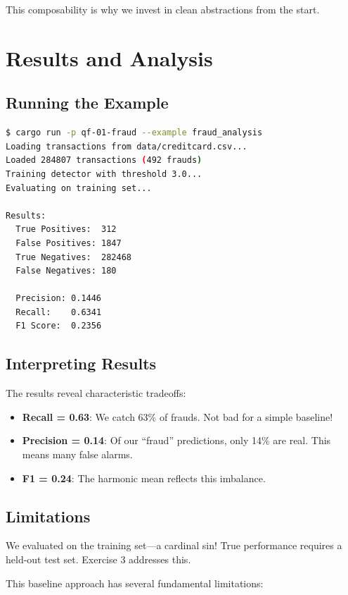This composability is why we invest in clean abstractions from the start.

\section{Results and Analysis}

\subsection{Running the Example}

\begin{lstlisting}[language=bash]
$ cargo run -p qf-01-fraud --example fraud_analysis
Loading transactions from data/creditcard.csv...
Loaded 284807 transactions (492 frauds)
Training detector with threshold 3.0...
Evaluating on training set...

Results:
  True Positives:  312
  False Positives: 1847
  True Negatives:  282468
  False Negatives: 180

  Precision: 0.1446
  Recall:    0.6341
  F1 Score:  0.2356
\end{lstlisting}

\subsection{Interpreting Results}

The results reveal characteristic tradeoffs:

\begin{itemize}
    \item \textbf{Recall = 0.63}: We catch 63\% of frauds. Not bad for a simple baseline!
    \item \textbf{Precision = 0.14}: Of our ``fraud'' predictions, only 14\% are real. This means many false alarms.
    \item \textbf{F1 = 0.24}: The harmonic mean reflects this imbalance.
\end{itemize}

\subsection{Limitations}

\begin{warning}
We evaluated on the training set---a cardinal sin! True performance requires a held-out test set. Exercise 3 addresses this.
\end{warning}

This baseline approach has several fundamental limitations:

